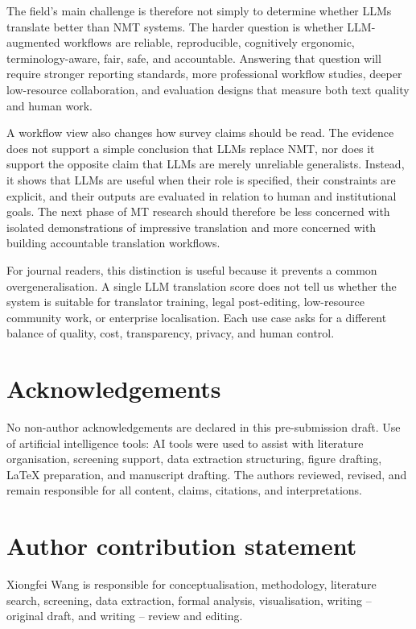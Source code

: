 \documentclass[11pt]{article}
\begin{document}
The field's main challenge is therefore not simply to determine whether LLMs translate better than NMT systems. The harder question is whether LLM-augmented workflows are reliable, reproducible, cognitively ergonomic, terminology-aware, fair, safe, and accountable. Answering that question will require stronger reporting standards, more professional workflow studies, deeper low-resource collaboration, and evaluation designs that measure both text quality and human work.

A workflow view also changes how survey claims should be read. The evidence does not support a simple conclusion that LLMs replace NMT, nor does it support the opposite claim that LLMs are merely unreliable generalists. Instead, it shows that LLMs are useful when their role is specified, their constraints are explicit, and their outputs are evaluated in relation to human and institutional goals. The next phase of MT research should therefore be less concerned with isolated demonstrations of impressive translation and more concerned with building accountable translation workflows.

For journal readers, this distinction is useful because it prevents a common overgeneralisation. A single LLM translation score does not tell us whether the system is suitable for translator training, legal post-editing, low-resource community work, or enterprise localisation. Each use case asks for a different balance of quality, cost, transparency, privacy, and human control.

\section*{Acknowledgements}
No non-author acknowledgements are declared in this pre-submission draft. Use of artificial intelligence tools: AI tools were used to assist with literature organisation, screening support, data extraction structuring, figure drafting, LaTeX preparation, and manuscript drafting. The authors reviewed, revised, and remain responsible for all content, claims, citations, and interpretations.

\section*{Author contribution statement}
Xiongfei Wang is responsible for conceptualisation, methodology, literature search, screening, data extraction, formal analysis, visualisation, writing -- original draft, and writing -- review and editing.
\end{document}
